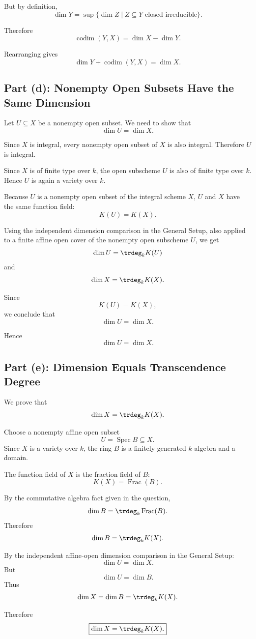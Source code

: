 But by definition,
\[
\dim Y
=
\sup\{\dim Z\mid Z\subseteq Y \text{ closed irreducible}\}.
\]

Therefore
\[
\operatorname{codim}(Y,X)=\dim X-\dim Y.
\]

Rearranging gives
\[
\boxed{\dim Y+\operatorname{codim}(Y,X)=\dim X.}
\]

\subsection{Part (d): Nonempty Open Subsets Have the Same Dimension}

Let \(U\subseteq X\) be a nonempty open subset. We need to show that
\[
\dim U=\dim X.
\]

Since \(X\) is integral, every nonempty open subset of \(X\) is also integral. Therefore \(U\) is integral.

Since \(X\) is of finite type over \(k\), the open subscheme \(U\) is also of finite type over \(k\). Hence \(U\) is again a variety over \(k\).

Because \(U\) is a nonempty open subset of the integral scheme \(X\), \(U\) and \(X\) have the same function field:
\[
K(U)=K(X).
\]

Using the independent dimension comparison in the General Setup, also applied to a finite affine open cover of the nonempty open subscheme $U$, we get
\[
\dim U=\trdeg_k K(U)
\]
and
\[
\dim X=\trdeg_k K(X).
\]

Since
\[
K(U)=K(X),
\]
we conclude that
\[
\dim U=\dim X.
\]

Hence
\[
\boxed{\dim U=\dim X.}
\]

\subsection{Part (e): Dimension Equals Transcendence Degree}

We prove that
\[
\dim X=\trdeg_k K(X).
\]

Choose a nonempty affine open subset
\[
U=\operatorname{Spec} B\subseteq X.
\]
Since \(X\) is a variety over \(k\), the ring \(B\) is a finitely generated \(k\)-algebra and a domain.

The function field of \(X\) is the fraction field of \(B\):
\[
K(X)=\operatorname{Frac}(B).
\]

By the commutative algebra fact given in the question,
\[
\dim B=\trdeg_k \operatorname{Frac}(B).
\]
Therefore
\[
\dim B=\trdeg_k K(X).
\]

By the independent affine-open dimension comparison in the General Setup:
\[
\dim U=\dim X.
\]
But
\[
\dim U=\dim B.
\]
Thus
\[
\dim X=\dim B=\trdeg_k K(X).
\]

Therefore
\[
\boxed{\dim X=\trdeg_k K(X).}
\]

\newpage
